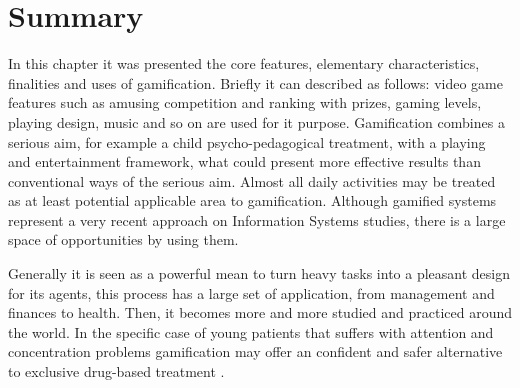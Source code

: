\section{Summary}

In this chapter it was presented the core features, elementary characteristics, finalities and uses of gamification. Briefly it can described as follows: video game features such as amusing competition and ranking with prizes, gaming levels, playing design, music and so on are used for it purpose. Gamification combines a serious aim, for example a child psycho-pedagogical treatment, with a playing and entertainment framework, what could present more effective results than conventional ways of the serious aim. Almost all daily activities may be treated as at least potential applicable area to gamification. Although gamified systems represent a very recent approach on Information Systems studies, there is a large space of opportunities by using them.

Generally it is seen as a powerful mean to turn heavy tasks into a pleasant design for its agents, this process has a large set of application, from management and finances to health.  Then, it becomes more and more studied and practiced around the world. In the specific case of young patients that suffers with attention and concentration problems gamification may offer an confident and safer alternative to exclusive drug-based treatment \citep{Nemeth}.